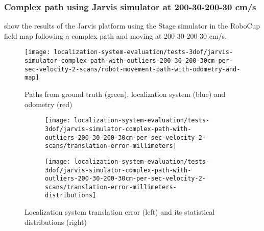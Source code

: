 \subsubsection{Complex path using Jarvis simulator at 200-30-200-30 cm/s}

 show the results of the Jarvis platform using the Stage simulator in the RoboCup field map following a complex path and moving at 200-30-200-30 cm/s.

\begin{figure}[H]
	\centering
	\texttt{[image: localization-system-evaluation/tests-3dof/jarvis-simulator-complex-path-with-outliers-200-30-200-30cm-per-sec-velocity-2-scans/robot-movement-path-with-odometry-and-map]}
	\caption{Paths from ground truth (green), localization system (blue) and odometry (red)}
	\label{fig:localization-system-evaluation_jarvis-simulator-complex-path-with-outliers-200-30-200-30cm-per-sec-velocity-2-scans}
\end{figure}

\begin{figure}[H]
	\centering
	\begin{subfigure}[h]{0.47\textwidth}
		\centering
		\texttt{[image: localization-system-evaluation/tests-3dof/jarvis-simulator-complex-path-with-outliers-200-30-200-30cm-per-sec-velocity-2-scans/translation-error-millimeters]}
	\end{subfigure}
	\begin{subfigure}[h]{0.47\textwidth}
		\centering
		\texttt{[image: localization-system-evaluation/tests-3dof/jarvis-simulator-complex-path-with-outliers-200-30-200-30cm-per-sec-velocity-2-scans/translation-error-millimeters-distributions]}
	\end{subfigure}
	\caption{Localization system translation error (left) and its statistical distributions (right)}
	\label{fig:localization-system-evaluation_jarvis-simulator-complex-path-with-outliers-200-30-200-30cm-per-sec-velocity-2-scans_translation-errors}
\end{figure}

